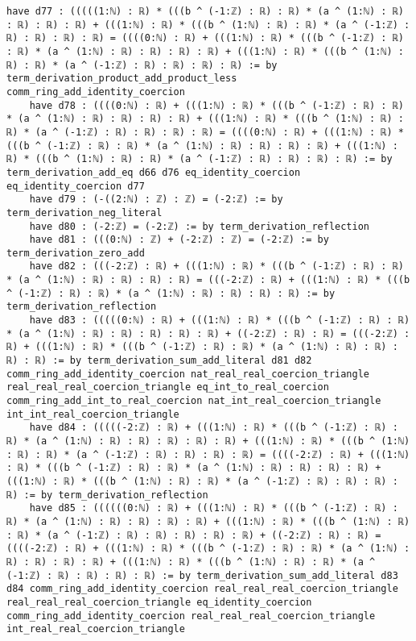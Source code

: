 \documentclass{article}
\begin{document}
\begin{tcolorbox}[colback=white!10, width=\linewidth]
\begin{lstlisting}[language=Lean4]
    have d77 : (((((1:ℕ) : ℝ) * (((b ^ (-1:ℤ) : ℝ) : ℝ) * (a ^ (1:ℕ) : ℝ) : ℝ) : ℝ) : ℝ) + (((1:ℕ) : ℝ) * (((b ^ (1:ℕ) : ℝ) : ℝ) * (a ^ (-1:ℤ) : ℝ) : ℝ) : ℝ) : ℝ) = ((((0:ℕ) : ℝ) + (((1:ℕ) : ℝ) * (((b ^ (-1:ℤ) : ℝ) : ℝ) * (a ^ (1:ℕ) : ℝ) : ℝ) : ℝ) : ℝ) + (((1:ℕ) : ℝ) * (((b ^ (1:ℕ) : ℝ) : ℝ) * (a ^ (-1:ℤ) : ℝ) : ℝ) : ℝ) : ℝ) := by term_derivation_product_add_product_less comm_ring_add_identity_coercion
    have d78 : ((((0:ℕ) : ℝ) + (((1:ℕ) : ℝ) * (((b ^ (-1:ℤ) : ℝ) : ℝ) * (a ^ (1:ℕ) : ℝ) : ℝ) : ℝ) : ℝ) + (((1:ℕ) : ℝ) * (((b ^ (1:ℕ) : ℝ) : ℝ) * (a ^ (-1:ℤ) : ℝ) : ℝ) : ℝ) : ℝ) = ((((0:ℕ) : ℝ) + (((1:ℕ) : ℝ) * (((b ^ (-1:ℤ) : ℝ) : ℝ) * (a ^ (1:ℕ) : ℝ) : ℝ) : ℝ) : ℝ) + (((1:ℕ) : ℝ) * (((b ^ (1:ℕ) : ℝ) : ℝ) * (a ^ (-1:ℤ) : ℝ) : ℝ) : ℝ) : ℝ) := by term_derivation_add_eq d66 d76 eq_identity_coercion eq_identity_coercion d77
    have d79 : (-((2:ℕ) : ℤ) : ℤ) = (-2:ℤ) := by term_derivation_neg_literal
    have d80 : (-2:ℤ) = (-2:ℤ) := by term_derivation_reflection
    have d81 : (((0:ℕ) : ℤ) + (-2:ℤ) : ℤ) = (-2:ℤ) := by term_derivation_zero_add
    have d82 : (((-2:ℤ) : ℝ) + (((1:ℕ) : ℝ) * (((b ^ (-1:ℤ) : ℝ) : ℝ) * (a ^ (1:ℕ) : ℝ) : ℝ) : ℝ) : ℝ) = (((-2:ℤ) : ℝ) + (((1:ℕ) : ℝ) * (((b ^ (-1:ℤ) : ℝ) : ℝ) * (a ^ (1:ℕ) : ℝ) : ℝ) : ℝ) : ℝ) := by term_derivation_reflection
    have d83 : (((((0:ℕ) : ℝ) + (((1:ℕ) : ℝ) * (((b ^ (-1:ℤ) : ℝ) : ℝ) * (a ^ (1:ℕ) : ℝ) : ℝ) : ℝ) : ℝ) : ℝ) + ((-2:ℤ) : ℝ) : ℝ) = (((-2:ℤ) : ℝ) + (((1:ℕ) : ℝ) * (((b ^ (-1:ℤ) : ℝ) : ℝ) * (a ^ (1:ℕ) : ℝ) : ℝ) : ℝ) : ℝ) := by term_derivation_sum_add_literal d81 d82 comm_ring_add_identity_coercion nat_real_real_coercion_triangle real_real_real_coercion_triangle eq_int_to_real_coercion comm_ring_add_int_to_real_coercion nat_int_real_coercion_triangle int_int_real_coercion_triangle
    have d84 : (((((-2:ℤ) : ℝ) + (((1:ℕ) : ℝ) * (((b ^ (-1:ℤ) : ℝ) : ℝ) * (a ^ (1:ℕ) : ℝ) : ℝ) : ℝ) : ℝ) : ℝ) + (((1:ℕ) : ℝ) * (((b ^ (1:ℕ) : ℝ) : ℝ) * (a ^ (-1:ℤ) : ℝ) : ℝ) : ℝ) : ℝ) = ((((-2:ℤ) : ℝ) + (((1:ℕ) : ℝ) * (((b ^ (-1:ℤ) : ℝ) : ℝ) * (a ^ (1:ℕ) : ℝ) : ℝ) : ℝ) : ℝ) + (((1:ℕ) : ℝ) * (((b ^ (1:ℕ) : ℝ) : ℝ) * (a ^ (-1:ℤ) : ℝ) : ℝ) : ℝ) : ℝ) := by term_derivation_reflection
    have d85 : ((((((0:ℕ) : ℝ) + (((1:ℕ) : ℝ) * (((b ^ (-1:ℤ) : ℝ) : ℝ) * (a ^ (1:ℕ) : ℝ) : ℝ) : ℝ) : ℝ) + (((1:ℕ) : ℝ) * (((b ^ (1:ℕ) : ℝ) : ℝ) * (a ^ (-1:ℤ) : ℝ) : ℝ) : ℝ) : ℝ) : ℝ) + ((-2:ℤ) : ℝ) : ℝ) = ((((-2:ℤ) : ℝ) + (((1:ℕ) : ℝ) * (((b ^ (-1:ℤ) : ℝ) : ℝ) * (a ^ (1:ℕ) : ℝ) : ℝ) : ℝ) : ℝ) + (((1:ℕ) : ℝ) * (((b ^ (1:ℕ) : ℝ) : ℝ) * (a ^ (-1:ℤ) : ℝ) : ℝ) : ℝ) : ℝ) := by term_derivation_sum_add_literal d83 d84 comm_ring_add_identity_coercion real_real_real_coercion_triangle real_real_real_coercion_triangle eq_identity_coercion comm_ring_add_identity_coercion real_real_real_coercion_triangle int_real_real_coercion_triangle

\end{lstlisting}
\end{tcolorbox}
\end{document}
